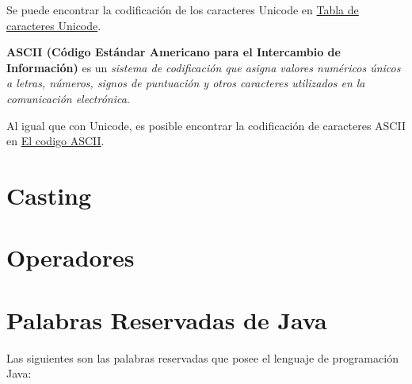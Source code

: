 \documentclass[12pt]{article}
\theoremstyle{largebreak}
\begin{document}
    Se puede encontrar la codificación de los caracteres Unicode en \href{https://symbl.cc/es/unicode-table/}{Tabla de caracteres Unicode}.

    \begin{mydef}
        \textbf{ASCII (Código Estándar Americano para el Intercambio de Información)} es un \textit{sistema de codificación que asigna valores numéricos únicos a letras, números, signos de puntuación y otros caracteres utilizados en la comunicación electrónica}.
    \end{mydef}

    Al igual que con Unicode, es posible encontrar la codificación de caracteres ASCII en \href{https://elcodigoascii.com.ar/}{El codigo ASCII}.


    \section{Casting}


    \section{Operadores}


    \newpage

    \section*{Palabras Reservadas de Java}

    Las siguientes son las palabras reservadas que posee el lenguaje de programación Java:
\end{document}
